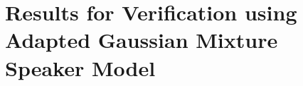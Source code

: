 \chapter{Results for Verification using Adapted Gaussian Mixture Speaker Model}
\label{apx:agmsm-verify-results}